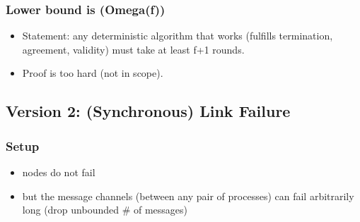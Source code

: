 \documentclass[11pt]{article}
\begin{document}
\subsubsection{Lower bound is (Omega(f))}
\label{sec:org3bd6172}
\begin{itemize}
\item Statement: any deterministic algorithm that works (fulfills termination,
agreement, validity) must take at least f+1 rounds.
\item Proof is too hard (not in scope).
\end{itemize}
\subsection{Version 2: (Synchronous) Link Failure}
\label{sec:org1388520}
\subsubsection{Setup}
\label{sec:orgb0908c8}
\begin{itemize}
\item nodes do not fail
\item but the message channels (between any pair of processes) can fail arbitrarily
long (drop unbounded \# of messages)
\end{itemize}
\end{document}
